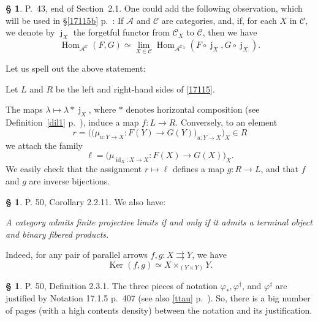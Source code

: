 \documentclass[12pt]{article}%
\theoremstyle{remark}
\theoremstyle{definition}
\newtheorem{s}[thm]{\S}%
\newcommand{\oo}{\operatorname}
\newcommand{\A}{\mathcal A}
\newcommand{\C}{\mathcal C}
\newcommand{\parar}{\rightrightarrows}
\DeclareMathOperator{\id}{id}
\DeclareMathOperator{\Hom}{Hom}%
\DeclareMathOperator{\Ker}{Ker}
\begin{document}
\begin{s} 
P.~43, end of Section~2.1. One could add the following observation, which will be used in \S\ref{17115b} p.~\pageref{17115b}: If $\A$ and $\C$ are categories, and, if, for each $X$ in $\C$, we denote by $\oo j_X$ the forgetful functor from $\C_X$ to $\C$, then we have
%
\begin{equation}\label{17115}
\Hom_{\A^\C}(F,G)\simeq\lim_{X\in\C}\Hom_{\A^{\C_X}}(F\circ\oo j_X,G\circ\oo j_X).
\end{equation}

Let us spell out the above statement: 

Let $L$ and $R$ be the left and right-hand sides of \eqref{17115}. 

The maps $\lambda\mapsto\lambda*\oo j_X$, where $*$ denotes horizontal composition (see Definition~\ref{dil1} p.~\pageref{dil1}), induce a map $f:L\to R$. Conversely, to an element  
$$
r=\Big(\big(\mu_{u:Y\to X}:F(Y)\to G(Y)\big)_{u:Y\to X}\Big)_X\in R
$$ 
we attach the family
$$
\ell=\big(\mu_{\id_X:X\to X}:F(X)\to G(X)\big)_X.
$$ 
We easily check that the assignment $r\mapsto\ell$ defines a map $g:R\to L$, and that $f$ and $g$ are inverse bijections.
\end{s}

%

\begin{s}\label{fpl}
P. 50, Corollary 2.2.11. We also have:

\emph{A category admits finite projective limits if and only if it admits a terminal object and binary fibered products.}

Indeed, for any pair of parallel arrows $f,g:X\parar Y$, we have 
$$
\Ker(f,g)\simeq X\times_{(Y\times Y)}Y.
$$
\end{s}

%

\begin{s}
P. 50, Definition 2.3.1. The three pieces of notation $\varphi_*,\varphi^\dagger$, and $\varphi^\ddagger$ are justified by Notation 17.1.5 p.~407 (see also \eqref{ttau} p.~\pageref{ttau}). So, there is a big number of pages (with a high contents density) between the notation and its justification.
\end{s}

%
\end{document}
